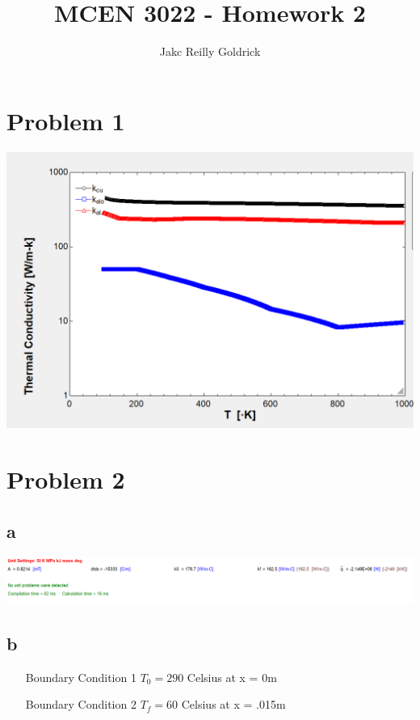 \documentclass[]{report}
\title{MCEN 3022 - Homework 2}
\author{Jakc Reilly Goldrick}
\begin{document}
\maketitle

\section{Problem 1}


\begin{center}
	\includegraphics[width=0.7\linewidth]{"../1-graph"}
\end{center}


\section{Problem 2}

\subsection{a}

\begin{center}
	\includegraphics[width=1\linewidth]{"../2-sol"}
\end{center}


\subsection{b}

\begin{center}
	\begin{itemize}
		\centering  
		\item[Boundary Condition 1] $T_0 = 290$ Celsius at x = 0m
		
		\item[Boundary Condition 2] $T_f = 60$ Celsius at x = .015m
	\end{itemize}
\end{center}
\end{document}
